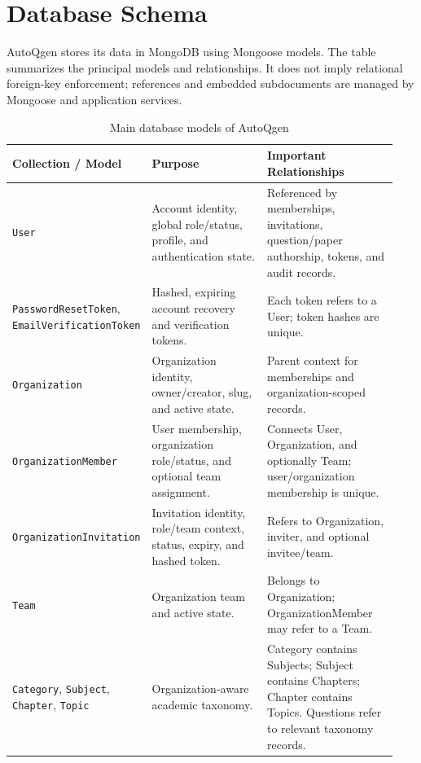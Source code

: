 \section{Database Schema}

AutoQgen stores its data in MongoDB using Mongoose models. The table summarizes the principal models and relationships. It does not imply relational foreign-key enforcement; references and embedded subdocuments are managed by Mongoose and application services.

\begin{table}[H]
    \centering
    \caption{Main database models of AutoQgen}
    \label{tab:database-collections}
    \begin{tabular}{|p{0.30\linewidth}|p{0.30\linewidth}|p{0.34\linewidth}|}
        \hline
        \textbf{Collection / Model} & \textbf{Purpose} & \textbf{Important Relationships} \\
        \hline
        \texttt{User} & Account identity, global role/status, profile, and authentication state. & Referenced by memberships, invitations, question/paper authorship, tokens, and audit records. \\
        \hline
        \texttt{PasswordResetToken}, \texttt{EmailVerificationToken} & Hashed, expiring account recovery and verification tokens. & Each token refers to a User; token hashes are unique. \\
        \hline
        \texttt{Organization} & Organization identity, owner/creator, slug, and active state. & Parent context for memberships and organization-scoped records. \\
        \hline
        \texttt{OrganizationMember} & User membership, organization role/status, and optional team assignment. & Connects User, Organization, and optionally Team; user/organization membership is unique. \\
        \hline
        \texttt{OrganizationInvitation} & Invitation identity, role/team context, status, expiry, and hashed token. & Refers to Organization, inviter, and optional invitee/team. \\
        \hline
        \texttt{Team} & Organization team and active state. & Belongs to Organization; OrganizationMember may refer to a Team. \\
        \hline
        \texttt{Category}, \texttt{Subject}, \texttt{Chapter}, \texttt{Topic} & Organization-aware academic taxonomy. & Category contains Subjects; Subject contains Chapters; Chapter contains Topics. Questions refer to relevant taxonomy records. \\

\end{tabular}
\end{table}
